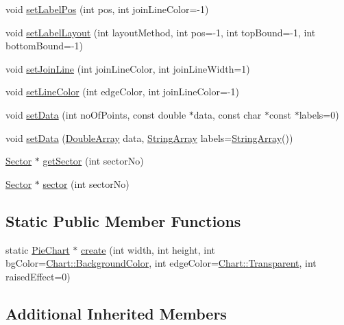 \begin{DoxyCompactItemize}
\item 
void \hyperlink{class_pie_chart_ac4b3730538d6f8dffea410599d1bae20}{set\+Label\+Pos} (int pos, int join\+Line\+Color=-\/1)
\item 
void \hyperlink{class_pie_chart_a3ddab403bbb5211e5af0aa9b9118b126}{set\+Label\+Layout} (int layout\+Method, int pos=-\/1, int top\+Bound=-\/1, int bottom\+Bound=-\/1)
\item 
void \hyperlink{class_pie_chart_ac78c35a17fa478ad58e4e3c19141778d}{set\+Join\+Line} (int join\+Line\+Color, int join\+Line\+Width=1)
\item 
void \hyperlink{class_pie_chart_a85321c33d5e247ee6bffddadbfa11c43}{set\+Line\+Color} (int edge\+Color, int join\+Line\+Color=-\/1)
\item 
void \hyperlink{class_pie_chart_a83b93ed30618333fcb4d2bd669e5fb0f}{set\+Data} (int no\+Of\+Points, const double $\ast$data, const char $\ast$const $\ast$labels=0)
\item 
void \hyperlink{class_pie_chart_ae79f9956e6e0f80469d9c750c2bceb7d}{set\+Data} (\hyperlink{class_double_array}{Double\+Array} data, \hyperlink{class_string_array}{String\+Array} labels=\hyperlink{class_string_array}{String\+Array}())
\item 
\hyperlink{class_sector}{Sector} $\ast$ \hyperlink{class_pie_chart_a2fabcab450f4eddf29566a2fbbe3c67d}{get\+Sector} (int sector\+No)
\item 
\hyperlink{class_sector}{Sector} $\ast$ \hyperlink{class_pie_chart_afe2a0e5754abdd92bf9c03262a20568a}{sector} (int sector\+No)
\end{DoxyCompactItemize}
\subsection*{Static Public Member Functions}
\begin{DoxyCompactItemize}
\item 
static \hyperlink{class_pie_chart}{Pie\+Chart} $\ast$ \hyperlink{class_pie_chart_abede1a66c46dfa9d3a8c0490e8190a4c}{create} (int width, int height, int bg\+Color=\hyperlink{namespace_chart_abee0d882fdc9ad0b001245ad9fc64011a134193bde693b9d152d0c6dc59fa7d7f}{Chart\+::\+Background\+Color}, int edge\+Color=\hyperlink{namespace_chart_abee0d882fdc9ad0b001245ad9fc64011afc6811800a9e2582dac0157b6279f836}{Chart\+::\+Transparent}, int raised\+Effect=0)
\end{DoxyCompactItemize}
\subsection*{Additional Inherited Members}


